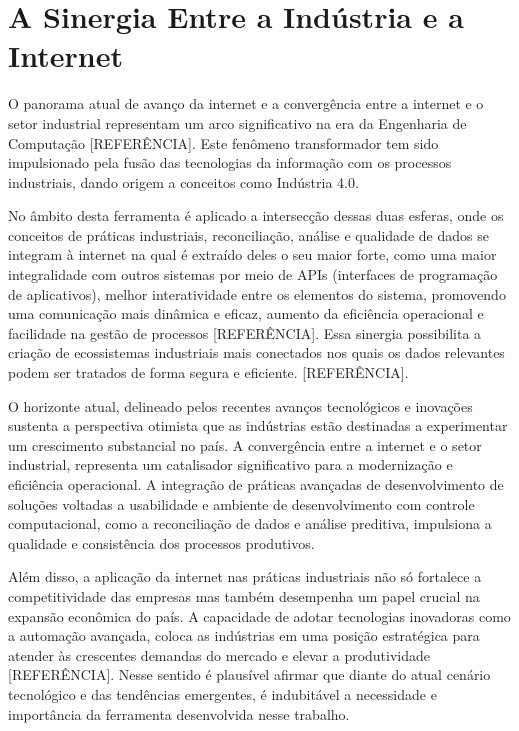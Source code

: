 \section{A Sinergia Entre a Indústria e a Internet}

O panorama atual de avanço da internet e a convergência entre a internet e o setor industrial representam um arco significativo na era da Engenharia de Computação [REFERÊNCIA]. Este fenômeno transformador tem sido impulsionado pela fusão das tecnologias da informação com os processos industriais, dando origem a conceitos como Indústria 4.0. 

No âmbito desta ferramenta é aplicado a intersecção dessas duas esferas, onde os conceitos de práticas industriais, reconciliação, análise e qualidade de dados se integram à internet na qual é extraído deles o seu maior forte, como uma maior integralidade com outros sistemas por meio de APIs (interfaces de programação de aplicativos), melhor interatividade entre os elementos do sistema, promovendo uma comunicação mais dinâmica e eficaz, aumento da eficiência operacional e facilidade na gestão de processos [REFERÊNCIA]. Essa sinergia possibilita a criação de ecossistemas industriais mais conectados nos quais os dados relevantes podem ser tratados de forma segura e eficiente. [REFERÊNCIA].

O horizonte atual, delineado pelos recentes avanços tecnológicos e inovações sustenta a perspectiva otimista que as indústrias estão destinadas a experimentar um crescimento substancial no país. A convergência entre a internet e o setor industrial, representa um catalisador significativo para a modernização e eficiência operacional. A integração de práticas avançadas de desenvolvimento de soluções voltadas a usabilidade e ambiente de desenvolvimento com controle computacional, como a reconciliação de dados e análise preditiva, impulsiona a qualidade e consistência dos processos produtivos.

Além disso, a aplicação da internet nas práticas industriais não só fortalece a competitividade das empresas mas também desempenha um papel crucial na expansão econômica do país. A capacidade de adotar tecnologias inovadoras como a automação avançada, coloca as indústrias em uma posição estratégica para atender às crescentes demandas do mercado e elevar a produtividade [REFERÊNCIA]. Nesse sentido é plausível afirmar que diante do atual cenário tecnológico e das tendências emergentes, é indubitável a necessidade e importância da ferramenta desenvolvida nesse trabalho.